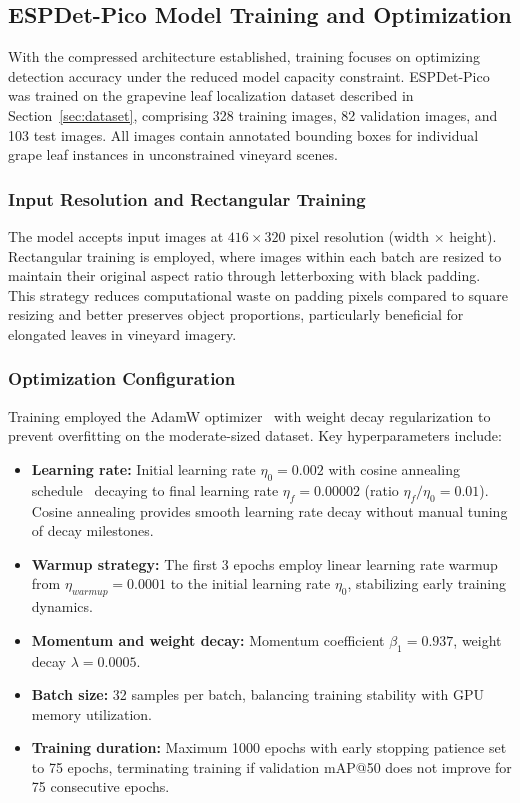 \subsection{ESPDet-Pico Model Training and Optimization}

With the compressed architecture established, training focuses on optimizing detection accuracy under the reduced model capacity constraint. ESPDet-Pico was trained on the grapevine leaf localization dataset described in Section~\ref{sec:dataset}, comprising 328 training images, 82 validation images, and 103 test images. All images contain annotated bounding boxes for individual grape leaf instances in unconstrained vineyard scenes.

\subsubsection*{Input Resolution and Rectangular Training}

The model accepts input images at $416 \times 320$ pixel resolution (width $\times$ height). Rectangular training is employed, where images within each batch are resized to maintain their original aspect ratio through letterboxing with black padding. This strategy reduces computational waste on padding pixels compared to square resizing and better preserves object proportions, particularly beneficial for elongated leaves in vineyard imagery.

\subsubsection*{Optimization Configuration}

Training employed the AdamW optimizer~\cite{loshchilov2017decoupled} with weight decay regularization to prevent overfitting on the moderate-sized dataset. Key hyperparameters include:

\begin{itemize}
    \item \textbf{Learning rate:} Initial learning rate $\eta_0 = 0.002$ with cosine annealing schedule~\cite{loshchilov2016sgdr} decaying to final learning rate $\eta_f = 0.00002$ (ratio $\eta_f / \eta_0 = 0.01$). Cosine annealing provides smooth learning rate decay without manual tuning of decay milestones.
    \item \textbf{Warmup strategy:} The first 3 epochs employ linear learning rate warmup from $\eta_{warmup} = 0.0001$ to the initial learning rate $\eta_0$, stabilizing early training dynamics.
    \item \textbf{Momentum and weight decay:} Momentum coefficient $\beta_1 = 0.937$, weight decay $\lambda = 0.0005$.
    \item \textbf{Batch size:} 32 samples per batch, balancing training stability with GPU memory utilization.
    \item \textbf{Training duration:} Maximum 1000 epochs with early stopping patience set to 75 epochs, terminating training if validation mAP@50 does not improve for 75 consecutive epochs.
\end{itemize}

